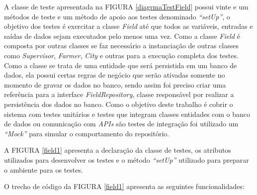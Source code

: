 A classe de teste apresentada na FIGURA \ref{diagrmaTestField} possui vinte e um métodos de teste e um método de apoio aos testes denominado \textit{“setUp”}, o objetivo dos testes é exercitar a classe \textit{Field} até que todos as variáveis, entradas e saídas de dados sejam executados pelo menos uma vez. Como a classe \textit{Field} é composta por outras classes se faz necessário a instanciação de outras classes como \textit{Supervisor}, \textit{Farmer}, \textit{City} e outras para a execução completa dos testes. Como a classe se trata de uma entidade que será persistida em um banco de dados, ela possui certas regras de negócio que serão ativadas somente no momento de gravar os dados no banco, sendo assim foi preciso criar uma referência para a interface \textit{FieldRepository}, classe responsável por realizar a persistência dos dados no banco. Como o objetivo deste trabalho é cobrir o sistema com testes unitários e testes que integram classes entidades com o banco de dados ou comunicação com \textit{APIs} são testes de integração foi utilizado um\textit{ “Mock”} para simular o comportamento do repositório.

A FIGURA \ref{field1} apresenta a declaração da classe de testes, os atributos utilizados para desenvolver os testes e o método\textit{ “setUp”} utilizado para preparar o ambiente para os testes.


O trecho de código da FIGURA \ref{field1} apresenta as seguintes funcionalidades:





